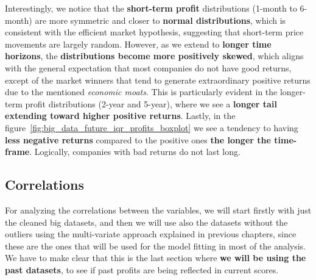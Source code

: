 \documentclass[11pt,english,a4paper,hidelinks]{book}
\begin{document}
\noindent Interestingly, we notice that the \textbf{short-term profit} distributions (1-month to 6-month) are more symmetric and closer to \textbf{normal distributions}, which is consistent with the efficient market hypothesis, suggesting that short-term price movements are largely random. However, as we extend to \textbf{longer time horizons}, the \textbf{distributions become more positively skewed}, which aligns with the general expectation that most companies do not have good returns, except of the market winners that tend to generate extraordinary positive returns due to the mentioned \textit{economic moats}. This is particularly evident in the longer-term profit distributions (2-year and 5-year), where we see a \textbf{longer tail extending toward higher positive returns}. Lastly, in the figure~\ref{fig:big_data_future_iqr_profits_boxplot} we see a tendency to having \textbf{less negative returns} compared to the positive ones \textbf{the longer the time-frame}. Logically, companies with bad returns do not last long.

\subsection{Correlations}

For analyzing the correlations between the variables, we will start firstly with just the cleaned big datasets, and then we will use also the datasets without the outliers using the multi-variate approach explained in previous chapters, since these are the ones that will be used for the model fitting in most of the analysis. We have to make clear that this is the last section where \textbf{we will be using the past datasets}, to see if past profits are being reflected in current scores.
\end{document}
